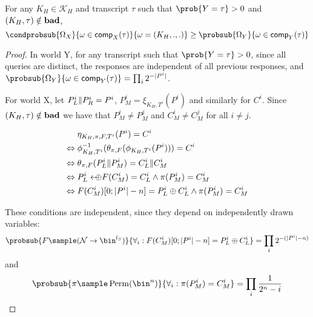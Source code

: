 \documentclass[eprint.tex]{subfiles}
\begin{document}
\begin{lemma} \label{notbad}
    For any $K_H \in \mathcal{K}_H$ and transcript $\tau$ such that $\prob{Y = \tau} > 0$ and
    $(K_H, \tau) \notin \operatorname{\mathbf{bad}}$,
    \begin{displaymath}
        \condprobsub{\Omega_X}{\omega \in \comp_X(\tau)}{\omega = (K_H, ., .)}
        \geq
        \probsub{\Omega_Y}{\omega \in \comp_Y(\tau)}
    \end{displaymath}
\end{lemma}

\begin{proof}
    In world Y, for any transcript such that $\prob{Y = \tau} > 0$,
    since all queries are distinct, the responses are independent of all
    previous responses, and
    $\probsub{\Omega_Y}{\omega \in \comp_Y(\tau)} = \prod_i 2^{-|P^i|}$.

    For world X, let $P_L^i \Vert P_R^i = P^i$, $P_M^i = \xi_{K_H, T^i}(P^i)$ and similarly for $C^i$.
    Since $(K_H, \tau) \notin \operatorname{\mathbf{bad}}$ we have that $P_M^i \neq P_M^j$
    and $C_M^i \neq C_M^j$ for all $i \neq j$.

    \begin{align*}
        {}& \eta_{K_H, \pi, F, T^i}(P^i) = C^i\\
        \Leftrightarrow {}& \phi_{K_H,T^i}^{-1}(\theta_{\pi, F}(\phi_{K_H,T^i}(P^i))) = C^i\\
        \Leftrightarrow {}& \theta_{\pi, F}(P_L^i \Vert P_M^i) = C_L^i \Vert C_M^i \\
        \Leftrightarrow {}& P_L^i \leftarrow\mkern-12mu\oplus F(C_M^i) = C_L^i \wedge \pi(P_M^i) = C_M^i \\
        \Leftrightarrow {}& F(C_M^i)[0;|P^i| - n] = P_L^i \oplus C_L^i \wedge \pi(P_M^i) = C_M^i \\
    \end{align*}

    These conditions are independent, since they depend on independently drawn
    variables:
    \begin{displaymath}
        \probsub{
            F \sample (\mathcal{N} \rightarrow \bin^{l_S})
        }{
            \forall_i : F(C_M^i)[0;|P^i| - n] = P_L^i \oplus C_L^i
        } = \prod_i 2^{-(|P^i| - n)}
    \end{displaymath}
    and
    \begin{displaymath}
        \probsub{
            \pi \sample \Perm(\bin^n)
        }{
            \forall_i : \pi(P_M^i) = C_M^i
        } = \prod_i \frac{1}{2^n - i}
    \end{displaymath}


\end{proof}
\end{document}
